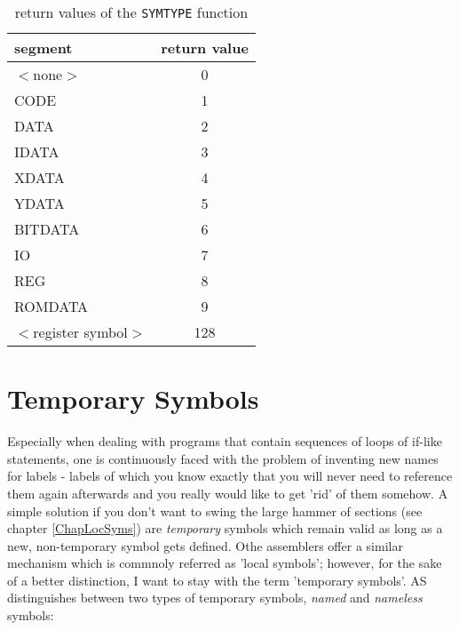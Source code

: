 \documentclass[12pt,twoside]{report}
\newcommand{\tty}[1]{{\tt #1}}
\begin{document}
\begin{table}[htb]
\begin{center}
\begin{tabular}{|l|c|}
\hline      
segment & return value \\
\hline      
$<$none$>$ & 0 \\
CODE & 1 \\ 
DATA & 2 \\                                       
IDATA & 3 \\
XDATA & 4 \\                                      
YDATA & 5 \\                                      
BITDATA & 6 \\
IO & 7 \\
REG & 8 \\                                        
ROMDATA & 9 \\
$<$register symbol$>$ & 128 \\                     
\hline                                            
\end{tabular}                                     
\end{center}                                      
\caption{return values of the \tty{SYMTYPE} function\label{TabSegNums}}
\end{table}


\section{Temporary Symbols}

Especially when dealing with programs that contain sequences of loops of
if-like statements, one is continuously faced with the problem of
inventing new names for labels - labels of which you know exactly that you
will never need to reference them again afterwards and you really would
like to get 'rid' of them somehow.  A simple solution if you don't want to
swing the large hammer of sections (see chapter \ref{ChapLocSyms}) are
{\em temporary} symbols which remain valid as long as a new,
non-temporary symbol gets defined.  Othe assemblers offer a similar
mechanism which is commnoly referred as 'local symbols'; however, for the
sake of a better distinction, I want to stay with the term 'temporary
symbols'.  AS distinguishes between two types of temporary symbols, {\em
named} and {\em nameless} symbols:
\end{document}
